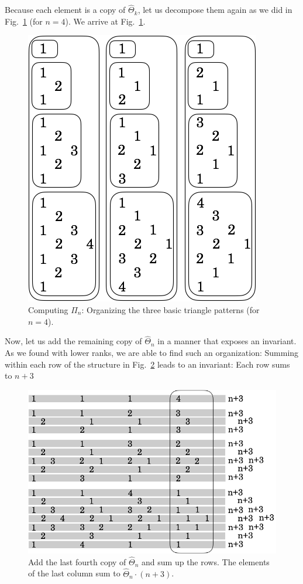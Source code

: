 Because each element is a  copy of $\widehat{\Theta}_k$, let us decompose them again as we did in Fig.~\ref{fig:Tetrahedral7} (for $n=4$).  We arrive at Fig.~\ref{fig:Tetrahedral7}.
\begin{figure}[h]
\begin{center}
        \includegraphics[scale=0.35]{FiguresArithmetic/appTetrahedral7}
        \caption{Computing $\Pi_n$: Organizing the three basic triangle patterns (for $n=4$).}
        \label{fig:Tetrahedral7}
\end{center}
\end{figure}
Now, let us add the remaining copy of $\widehat{\Theta}_n$ in a manner that exposes an invariant.  As we found with lower ranks, we are able to find such an organization:
Summing within each row of the structure in Fig.~\ref{fig:Tetrahedral5} leads to an invariant: Each row sums to $n+3$
\begin{figure}[h]
\begin{center}
        \includegraphics[scale=0.35]{FiguresArithmetic/appTetrahedral5}
        \caption{Add the last fourth copy of $\widehat{\Theta}_n$ and sum up the rows. The elements of the last column sum to $\widehat{\Theta}_n \cdot (n+3)$.}
        \label{fig:Tetrahedral5}
\end{center}
\end{figure}
